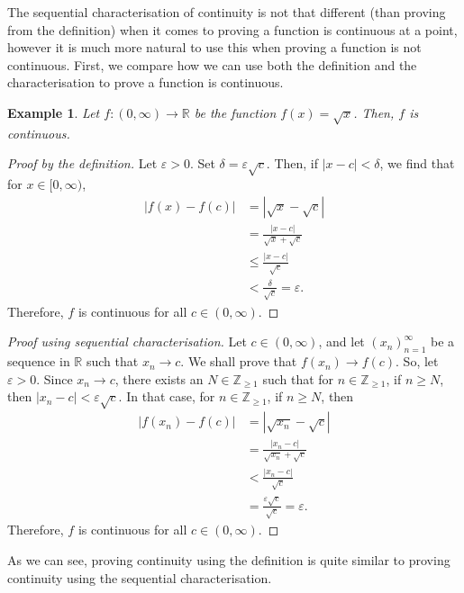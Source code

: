 \documentclass[a4paper, openany]{memoir}
\theoremstyle{definition}
\theoremstyle{plain}
\newtheorem{example}[definition]{Example}
\begin{document}
The sequential characterisation of continuity is not that different (than proving from the definition) when it comes to proving a function is continuous at a point, however it is much more natural to use this when proving a function is not continuous. First, we compare how we can use both the definition and the characterisation to prove a function is continuous.
\begin{example}
Let $f: (0, \infty) \to \mathbb{R}$ be the function $f(x) = \sqrt{x}$. Then, $f$ is continuous.
\end{example}
\begin{proof}[Proof by the definition]
Let $\varepsilon > 0$. Set $\delta = \varepsilon \sqrt{c}$. Then, if $|x - c| < \delta$, we find that for $x \in [0, \infty)$,
\begin{align*}
    |f(x) - f(c)| &= |\sqrt{x} - \sqrt{c}| \\
    &= \frac{|x - c|}{\sqrt{x} + \sqrt{c}} \\
    &\leqslant \frac{|x - c|}{\sqrt{c}} \\
    &< \frac{\delta}{\sqrt{c}} = \varepsilon.
\end{align*}
Therefore, $f$ is continuous for all $c \in (0, \infty)$.
\end{proof}
\begin{proof}[Proof using sequential characterisation]
Let $c \in (0, \infty)$, and let $(x_n)_{n=1}^{\infty}$ be a sequence in $\mathbb{R}$ such that $x_n \to c$. We shall prove that $f(x_n) \to f(c)$. So, let $\varepsilon > 0$. Since $x_n \to c$, there exists an $N \in \mathbb{Z}_{\geqslant 1}$ such that for $n \in \mathbb{Z}_{\geqslant 1}$, if $n \geqslant N$, then $|x_n - c| < \varepsilon \sqrt{c}$. In that case, for $n \in \mathbb{Z}_{\geqslant 1}$, if $n \geqslant N$, then
\begin{align*}
    |f(x_n) - f(c)| &= |\sqrt{x_n} - \sqrt{c}| \\
    &= \frac{|x_n - c|}{\sqrt{x_n} + \sqrt{c}} \\
    &< \frac{|x_n - c|}{\sqrt{c}} \\
    &= \frac{\varepsilon \sqrt{c}}{\sqrt{c}} = \varepsilon.
\end{align*}
Therefore, $f$ is continuous for all $c \in (0, \infty)$.
\end{proof}
\noindent As we can see, proving continuity using the definition is quite similar to proving continuity using the sequential characterisation.
\end{document}
